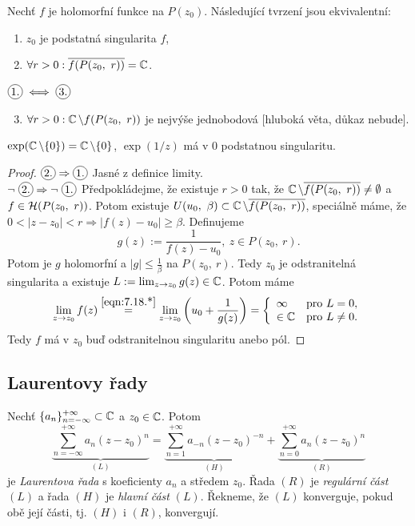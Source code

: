 \begin{theorem} Nechť $f$ je holomorfní funkce na $P(z_0)$. Následující tvrzení jsou ekvivalentní:
\begin{enumerate}
    \item $z_0$ je podstatná singularita $f$,
    \item $\forall r>0: \overline{f(P(z_0,\ r))}=\Comp$.
\end{enumerate}
\end{theorem}
\begin{note} $\circled{1.}\iff\circled{3.}$
\begin{enumerate}
\setcounter{enumi}{2}
    \item $\forall r>0:\operatorname{\mathbb{C}}\setminus f(P(z_0,\ r))$ je nejvýše jednobodová [hluboká věta, důkaz nebude].
\end{enumerate}

\begin{example}
$\exp(\operatorname{\mathbb{C}}\setminus\{0\})=\operatorname{\mathbb{C}}\setminus\{0\}$, $\exp(1/z)$ má v 0 podstatnou singularitu.
\end{example}
\end{note}
\begin{proof}
$\circled{2.}\Rightarrow\circled{1.}$ Jasné z definice limity.\\
$\neg\ \circled{2.}\Rightarrow\neg\ \circled{1.}$ Předpokládejme, že existuje $r>0$ tak, že $\Comp\setminus\overline{f(P(z_0,\ r))}\neq\emptyset$ a $f\in\Holo(P(z_0,\ r))$. Potom existuje $U(u_0,\ \beta)\subset\Comp\setminus\overline{f(P(z_0,\ r))}$, speciálně máme, že $0<|z-z_0|<r\Rightarrow|f(z)-u_0|\geq\beta$. 
Definujeme 
\begin{equation*} 
    \tag{*}
    \label{eqn:7.18.*}
    g(z):=\frac{1}{f(z)-u_0},\ z\in P(z_0,\ r)\text{.}
\end{equation*} 
Potom je $g$ holomorfní a $|g|\leq\frac{1}{\beta}$ na $P(z_0,\ r)$. Tedy $z_0$ je odstranitelná singularita a existuje $L:=\lim_{z\rightarrow z_0}g(z)\in\operatorname{\mathbb{C}}$. Potom máme 
$$\lim_{z\rightarrow z_0}f(z)\stackrel{\cref{eqn:7.18.*}}{=}\lim_{z\rightarrow z_0}\left(u_0+\frac{1}{g(z)}\right)=\twopartdef{\infty}{L=0,}{\in\Comp}{L\neq0.}$$
Tedy $f$ má v $z_0$ buď odstranitelnou singularitu anebo pól.
\end{proof}
\subsection{Laurentovy řady}
\begin{definition}
Nechť $\{a_n\}_{n=-\infty}^{+\infty}\subset\operatorname{\mathbb{C}}$ a $z_0\in\operatorname{\mathbb{C}}$. Potom 
\begin{equation}
    \underbrace{\sum_{n=-\infty}^{+\infty}a_n(z-z_0)^n}_{(L)}= \underbrace{\sum_{n=1}^{+\infty}a_{-n}(z-z_0)^{-n}}_{(H)} + \underbrace{\sum_{n=0}^{+\infty}a_n(z-z_0)^n}_{(R)}
\end{equation}
je \emph{Laurentova řada} s koeficienty ${a_n}$ a středem $z_0$. Řada $(R)$ je \emph{regulární část} $(L)$ a řada $(H)$ je \emph{hlavní část} $(L)$. Řekneme, že $(L)$ konverguje, pokud obě její části, tj. $(H)$ i $(R)$, konvergují.
\end{definition}

